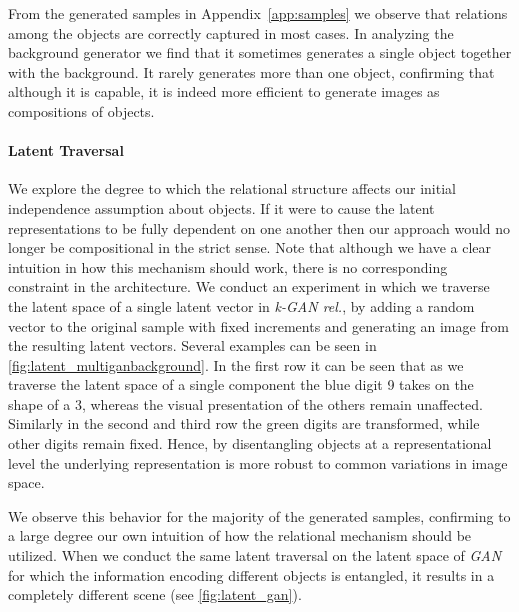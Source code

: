 \documentclass{article}
\begin{document}
From the generated samples in Appendix~\ref{app:samples} we observe that relations among the objects are correctly captured in most cases.
In analyzing the background generator we find that it sometimes generates a single object together with the background.
It rarely generates more than one object, confirming that although it is capable, it is indeed more efficient to generate images as compositions of objects.

\paragraph{Latent Traversal}
We explore the degree to which the relational structure affects our initial independence assumption about objects.
If it were to cause the latent representations to be fully dependent on one another then our approach would no longer be compositional in the strict sense.
Note that although we have a clear intuition in how this mechanism should work, there is no corresponding constraint in the architecture.
We conduct an experiment in which we traverse the latent space of a single latent vector in \emph{k-GAN rel.}, by adding a random vector to the original sample with fixed increments and generating an image from the resulting latent vectors.
Several examples can be seen in \autoref{fig:latent_multiganbackground}.
In the first row it can be seen that as we traverse the latent space of a single component the blue digit 9 takes on the shape of a 3, whereas the visual presentation of the others remain unaffected.
Similarly in the second and third row the green digits are transformed, while other digits remain fixed.
Hence, by disentangling objects at a representational level the underlying representation is more robust to common variations in image space.

We observe this behavior for the majority of the generated samples, confirming to a large degree our own intuition of how the relational mechanism should be utilized. %
When we conduct the same latent traversal on the latent space of \emph{GAN} for which the information encoding different objects is entangled, it results in a completely different scene (see \autoref{fig:latent_gan}).
\end{document}

